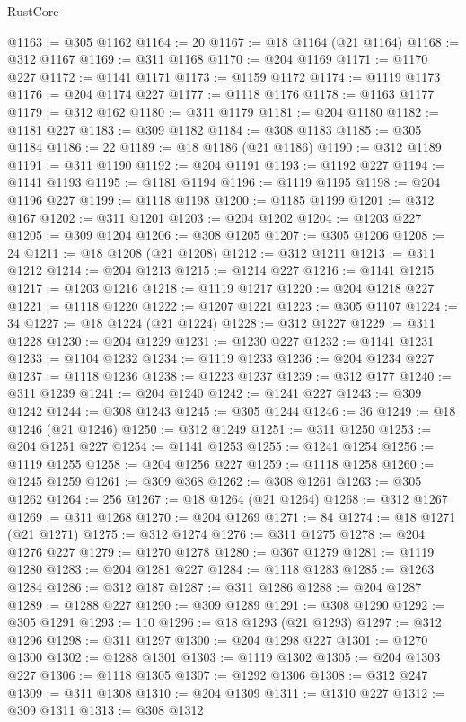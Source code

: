 \begin{lexlean}{RustCore}
\begin{coremodule}
@1163 := @305 @1162
@1164 := 20
@1167 := @18 @1164 (@21 @1164)
@1168 := @312 @1167
@1169 := @311 @1168
@1170 := @204 @1169
@1171 := @1170 @227
@1172 := @1141 @1171
@1173 := @1159 @1172
@1174 := @1119 @1173
@1176 := @204 @1174 @227
@1177 := @1118 @1176
@1178 := @1163 @1177
@1179 := @312 @162
@1180 := @311 @1179
@1181 := @204 @1180
@1182 := @1181 @227
@1183 := @309 @1182
@1184 := @308 @1183
@1185 := @305 @1184
@1186 := 22
@1189 := @18 @1186 (@21 @1186)
@1190 := @312 @1189
@1191 := @311 @1190
@1192 := @204 @1191
@1193 := @1192 @227
@1194 := @1141 @1193
@1195 := @1181 @1194
@1196 := @1119 @1195
@1198 := @204 @1196 @227
@1199 := @1118 @1198
@1200 := @1185 @1199
@1201 := @312 @167
@1202 := @311 @1201
@1203 := @204 @1202
@1204 := @1203 @227
@1205 := @309 @1204
@1206 := @308 @1205
@1207 := @305 @1206
@1208 := 24
@1211 := @18 @1208 (@21 @1208)
@1212 := @312 @1211
@1213 := @311 @1212
@1214 := @204 @1213
@1215 := @1214 @227
@1216 := @1141 @1215
@1217 := @1203 @1216
@1218 := @1119 @1217
@1220 := @204 @1218 @227
@1221 := @1118 @1220
@1222 := @1207 @1221
@1223 := @305 @1107
@1224 := 34
@1227 := @18 @1224 (@21 @1224)
@1228 := @312 @1227
@1229 := @311 @1228
@1230 := @204 @1229
@1231 := @1230 @227
@1232 := @1141 @1231
@1233 := @1104 @1232
@1234 := @1119 @1233
@1236 := @204 @1234 @227
@1237 := @1118 @1236
@1238 := @1223 @1237
@1239 := @312 @177
@1240 := @311 @1239
@1241 := @204 @1240
@1242 := @1241 @227
@1243 := @309 @1242
@1244 := @308 @1243
@1245 := @305 @1244
@1246 := 36
@1249 := @18 @1246 (@21 @1246)
@1250 := @312 @1249
@1251 := @311 @1250
@1253 := @204 @1251 @227
@1254 := @1141 @1253
@1255 := @1241 @1254
@1256 := @1119 @1255
@1258 := @204 @1256 @227
@1259 := @1118 @1258
@1260 := @1245 @1259
@1261 := @309 @368
@1262 := @308 @1261
@1263 := @305 @1262
@1264 := 256
@1267 := @18 @1264 (@21 @1264)
@1268 := @312 @1267
@1269 := @311 @1268
@1270 := @204 @1269
@1271 := 84
@1274 := @18 @1271 (@21 @1271)
@1275 := @312 @1274
@1276 := @311 @1275
@1278 := @204 @1276 @227
@1279 := @1270 @1278
@1280 := @367 @1279
@1281 := @1119 @1280
@1283 := @204 @1281 @227
@1284 := @1118 @1283
@1285 := @1263 @1284
@1286 := @312 @187
@1287 := @311 @1286
@1288 := @204 @1287
@1289 := @1288 @227
@1290 := @309 @1289
@1291 := @308 @1290
@1292 := @305 @1291
@1293 := 110
@1296 := @18 @1293 (@21 @1293)
@1297 := @312 @1296
@1298 := @311 @1297
@1300 := @204 @1298 @227
@1301 := @1270 @1300
@1302 := @1288 @1301
@1303 := @1119 @1302
@1305 := @204 @1303 @227
@1306 := @1118 @1305
@1307 := @1292 @1306
@1308 := @312 @247
@1309 := @311 @1308
@1310 := @204 @1309
@1311 := @1310 @227
@1312 := @309 @1311
@1313 := @308 @1312

\end{coremodule}
\end{lexlean}
